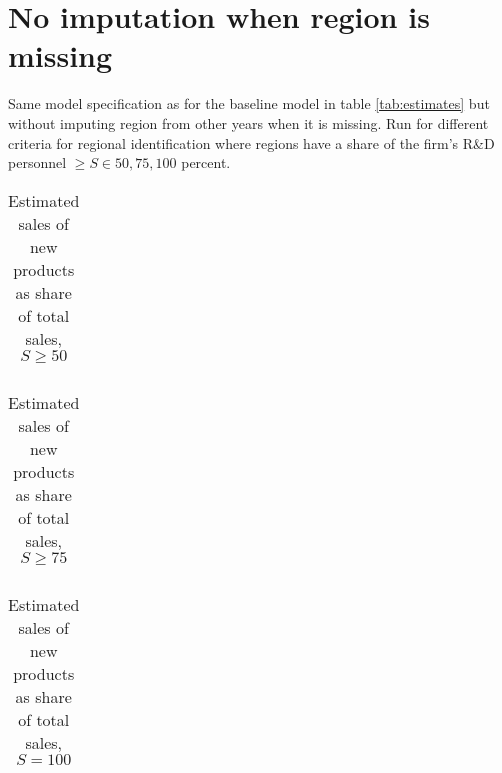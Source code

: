 \section{No imputation when region is missing}
\label{app:rob3}
\noindent
Same model specification as for the baseline model in table \ref{tab:estimates} but without imputing region from other years when it is missing. Run for different criteria for regional identification where regions have a share of the firm's R\&D personnel $\geq S\in50,75,100$ percent.
\begin{table}[H]
  \vspace{-.cm}
  \centering
  \caption{Estimated sales of new products as share of total sales, $S\geq50$}
  \footnotesize
    \begin{tabular}{lcc}
    \toprule
        
    \end{tabular}
  \label{tab:rob3.50}
  \vspace{-.5cm}
\end{table}

\begin{table}[H]
  \vspace{-.cm}
  \centering
  \caption{Estimated sales of new products as share of total sales, $S\geq75$}
  \footnotesize
    \begin{tabular}{lcc}
    \toprule
        
    \end{tabular}
  \label{tab:rob3.75}
  \vspace{-.5cm}
\end{table}

\begin{table}[H]
  \vspace{-.cm}
  \centering
  \caption{Estimated sales of new products as share of total sales, $S=100$}
  \footnotesize
    \begin{tabular}{lcc}
    \toprule
        
    \end{tabular}
  \label{tab:rob3.100}
  \vspace{-.5cm}
\end{table}

\clearpage
